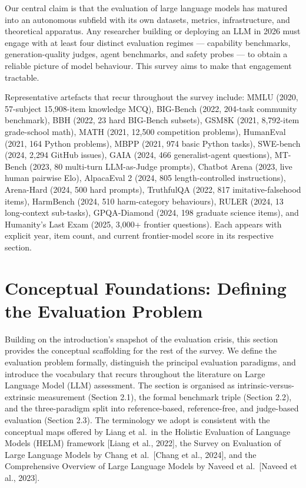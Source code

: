Our central claim is that the evaluation of large language models has matured into an autonomous subfield with its own datasets, metrics, infrastructure, and theoretical apparatus. Any researcher building or deploying an LLM in 2026 must engage with at least four distinct evaluation regimes --- capability benchmarks, generation-quality judges, agent benchmarks, and safety probes --- to obtain a reliable picture of model behaviour. This survey aims to make that engagement tractable.

Representative artefacts that recur throughout the survey include: MMLU (2020, 57-subject 15,908-item knowledge MCQ), BIG-Bench (2022, 204-task community benchmark), BBH (2022, 23 hard BIG-Bench subsets), GSM8K (2021, 8,792-item grade-school math), MATH (2021, 12,500 competition problems), HumanEval (2021, 164 Python problems), MBPP (2021, 974 basic Python tasks), SWE-bench (2024, 2,294 GitHub issues), GAIA (2024, 466 generalist-agent questions), MT-Bench (2023, 80 multi-turn LLM-as-Judge prompts), Chatbot Arena (2023, live human pairwise Elo), AlpacaEval 2 (2024, 805 length-controlled instructions), Arena-Hard (2024, 500 hard prompts), TruthfulQA (2022, 817 imitative-falsehood items), HarmBench (2024, 510 harm-category behaviours), RULER (2024, 13 long-context sub-tasks), GPQA-Diamond (2024, 198 graduate science items), and Humanity's Last Exam (2025, 3,000+ frontier questions). Each appears with explicit year, item count, and current frontier-model score in its respective section.

\section{Conceptual Foundations: Defining the Evaluation Problem}\label{conceptual-foundations-defining-the-evaluation-problem}

Building on the introduction's snapshot of the evaluation crisis, this section provides the conceptual scaffolding for the rest of the survey. We define the evaluation problem formally, distinguish the principal evaluation paradigms, and introduce the vocabulary that recurs throughout the literature on Large Language Model (LLM) assessment. The section is organised as intrinsic-versus-extrinsic measurement (Section 2.1), the formal benchmark triple (Section 2.2), and the three-paradigm split into reference-based, reference-free, and judge-based evaluation (Section 2.3). The terminology we adopt is consistent with the conceptual maps offered by Liang et al.~in the Holistic Evaluation of Language Models (HELM) framework {[}Liang et al., 2022{]}, the Survey on Evaluation of Large Language Models by Chang et al.~{[}Chang et al., 2024{]}, and the Comprehensive Overview of Large Language Models by Naveed et al.~{[}Naveed et al., 2023{]}.

